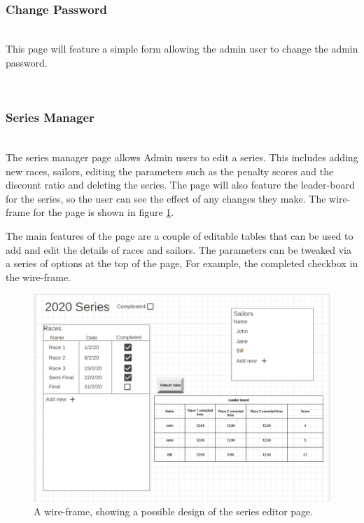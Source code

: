 \documentclass{l4proj}
\begin{document}
\hfill\\
\subsubsection{Change Password}
\hfill\\
This page will feature a simple form allowing the admin user to change the admin password.

\hfill\\
\subsubsection{Series Manager}
\hfill\\
The series manager page allows Admin users to edit a series. This includes adding new races, sailors, editing the parameters such as the penalty scores and the discount ratio and deleting the series. The page will also feature the leader-board for the series, so the user can see the effect of any changes they make. The wire-frame for the page is shown in figure \ref{fig:seriesEditorWF}.

The main features of the page are a couple of editable tables that can be used to add and edit the details of races and sailors. The parameters can be tweaked via a series of options at the top of the page, For example, the completed checkbox in the wire-frame.

\begin{figure}[H]
    \centering
    \includegraphics[width=1\linewidth]{images/Series editor 2.png} 

    \caption{A wire-frame, showing a possible design of the series editor page.
    }

    \label{fig:seriesEditorWF}
\end{figure}
\end{document}
